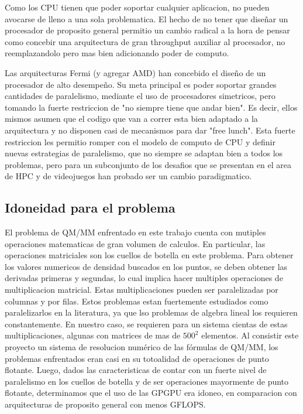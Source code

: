 Como los CPU tienen que poder soportar cualquier aplicacion, no pueden avocarse de lleno a una sola
problematica. El hecho de no tener que dise\~nar un procesador de proposito general permitio un cambio radical
a la hora de pensar como concebir una arquitectura de gran throughput auxiliar al procesador, no reemplazandolo
pero mas bien adicionando poder de computo.

Las arquitecturas Fermi (y agregar AMD) han concebido el dise\~no de un procesador de alto desempe\~no. 
Su meta principal es poder soportar grandes cantidades de paralelismo, mediante el uso de procesadores
simetricos, pero tomando la fuerte restriccion de "no siempre tiene que andar bien". Es decir, ellos
mismos asumen que el codigo que van a correr esta bien adaptado a la arquitectura y no disponen
casi de mecanismos para dar "free lunch". Esta fuerte restriccion les permitio romper con el modelo
de computo de CPU y definir nuevas estrategias de paralelismo, que no siempre se adaptan bien a todos
los problemas, pero para un subconjunto de los desafios que se presentan en el area de HPC y de videojuegos
han probado ser un cambio paradigmatico.

\subsection{Idoneidad para el problema}
El problema de QM/MM enfrentado en este trabajo cuenta con mutiples operaciones matematicas de gran
volumen de calculos. En particular, las operaciones matriciales son los cuellos de botella en este
problema. 
Para obtener los valores numericos de densidad buscados en los puntos, se deben obtener las derivadas primeras
y segundas, lo cual implica hacer multiples operaciones de multiplicacion matricial. Estas multiplicaciones
pueden ser paralelizadas por columnas y por filas. Estos problemas estan fuertemente estudiados como paralelizarlos
en la literatura, ya que lso problemas de algebra lineal los requieren constantemente. 
En nuestro caso, se requieren para un sistema cientas de estas multiplicaciones, algunas con matrices de mas de
$500^2$ elementos. Al consistir este proyecto un sistema de resolucion num\'erico de las f\'ormulas de QM/MM,
los problemas enfrentados eran casi en su totoalidad de operaciones de punto flotante. Luego, dados las
caracteristicas de contar con un fuerte nivel de paralelismo en los cuellos de botella y de ser operaciones
mayormente de punto flotante, determinamos que el uso de las GPGPU era idoneo, en comparacion con arquitecturas
de proposito general con menos GFLOPS.
